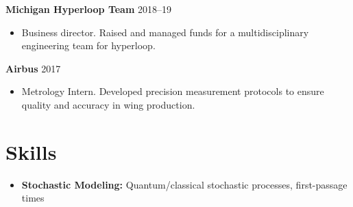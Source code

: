 \documentclass[10pt]{article}
\begin{document}
% 
    
\noindent\textbf{Michigan Hyperloop Team} \hfill 2018--19
\begin{itemize}
    \item Business director. Raised and managed funds for a multidisciplinary engineering team for hyperloop.  
\end{itemize}

\noindent\textbf{Airbus} \hfill 2017
\begin{itemize}
    \item Metrology Intern. Developed precision measurement protocols to ensure quality and accuracy in wing production.  
\end{itemize}





\section*{Skills}
\begin{itemize}
    \item \textbf{Stochastic Modeling:} Quantum/classical stochastic processes, first-passage times
\end{itemize}
\end{document}

